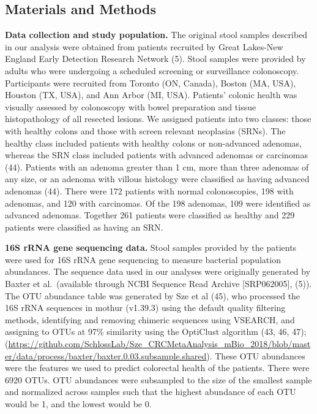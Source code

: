 \documentclass[
  11pt,
]{article}
\begin{document}
\hypertarget{materials-and-methods}{%
\subsection{Materials and Methods}\label{materials-and-methods}}

\textbf{Data collection and study population.} The original stool
samples described in our analysis were obtained from patients recruited
by Great Lakes-New England Early Detection Research Network (5). Stool
samples were provided by adults who were undergoing a scheduled
screening or surveillance colonoscopy. Participants were recruited from
Toronto (ON, Canada), Boston (MA, USA), Houston (TX, USA), and Ann Arbor
(MI, USA). Patients' colonic health was visually assessed by colonoscopy
with bowel preparation and tissue histopathology of all resected
lesions. We assigned patients into two classes: those with healthy
colons and those with screen relevant neoplasias (SRNs). The healthy
class included patients with healthy colons or non-advanced adenomas,
whereas the SRN class included patients with advanced adenomas or
carcinomas (44). Patients with an adenoma greater than 1 cm, more than
three adenomas of any size, or an adenoma with villous histology were
classified as having advanced adenomas (44). There were 172 patients
with normal colonoscopies, 198 with adenomas, and 120 with carcinomas.
Of the 198 adenomas, 109 were identified as advanced adenomas. Together
261 patients were classified as healthy and 229 patients were classified
as having an SRN.

\textbf{16S rRNA gene sequencing data.} Stool samples provided by the
patients were used for 16S rRNA gene sequencing to measure bacterial
population abundances. The sequence data used in our analyses were
originally generated by Baxter et al.~(available through NCBI Sequence
Read Archive {[}SRP062005{]}, (5)). The OTU abundance table was
generated by Sze et al (45), who processed the 16S rRNA sequences in
mothur (v1.39.3) using the default quality filtering methods,
identifying and removing chimeric sequences using VSEARCH, and assigning
to OTUs at 97\% similarity using the OptiClust algorithm (43, 46, 47);
(\url{https://github.com/SchlossLab/Sze_CRCMetaAnalysis_mBio_2018/blob/master/data/process/baxter/baxter.0.03.subsample.shared}).
These OTU abundances were the features we used to predict colorectal
health of the patients. There were 6920 OTUs. OTU abundances were
subsampled to the size of the smallest sample and normalized across
samples such that the highest abundance of each OTU would be 1, and the
lowest would be 0.
\end{document}
